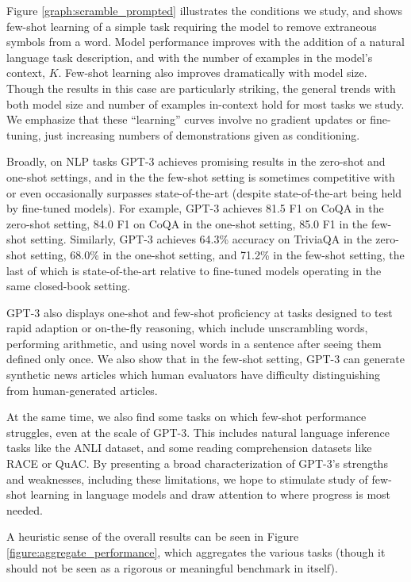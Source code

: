  Figure \ref{graph:scramble_prompted} illustrates the conditions we study, and shows few-shot learning of a simple task requiring the model to remove extraneous symbols from a word. Model performance improves with the addition of a natural language task description, and with the number of examples in the model's context, $K$. Few-shot learning also improves dramatically with model size.  Though the results in this case are particularly striking, the general trends with both model size and number of examples in-context hold for most tasks we study.  We emphasize that these ``learning'' curves involve no gradient updates or fine-tuning, just increasing numbers of demonstrations given as conditioning.

Broadly, on NLP tasks GPT-3 achieves promising results in the zero-shot and one-shot settings, and in the the few-shot setting is sometimes competitive with or even occasionally surpasses state-of-the-art (despite state-of-the-art being held by fine-tuned models).  For example, GPT-3 achieves 81.5 F1 on CoQA in the zero-shot setting, 84.0 F1 on CoQA in the one-shot setting, 85.0 F1 in the few-shot setting.  Similarly, GPT-3 achieves 64.3\% accuracy on TriviaQA in the zero-shot setting, 68.0\% in the one-shot setting, and 71.2\% in the few-shot setting, the last of which is state-of-the-art relative to fine-tuned models operating in the same closed-book setting.

GPT-3 also displays one-shot and few-shot proficiency at tasks designed to test rapid adaption or on-the-fly reasoning, which include unscrambling words, performing arithmetic, and using novel words in a sentence after seeing them defined only once.  We also show that in the few-shot setting, GPT-3 can generate synthetic news articles which human evaluators have difficulty distinguishing from human-generated articles.

At the same time, we also find some tasks on which few-shot performance struggles, even at the scale of GPT-3.  This includes natural language inference tasks like the ANLI dataset, and some reading comprehension datasets like RACE or QuAC.  By presenting a broad characterization of GPT-3's strengths and weaknesses, including these limitations, we hope to stimulate study of few-shot learning in language models and draw attention to where progress is most needed.  

A heuristic sense of the overall results can be seen in Figure \ref{figure:aggregate_performance}, which aggregates the various tasks (though it should not be seen as a rigorous or meaningful benchmark in itself).

